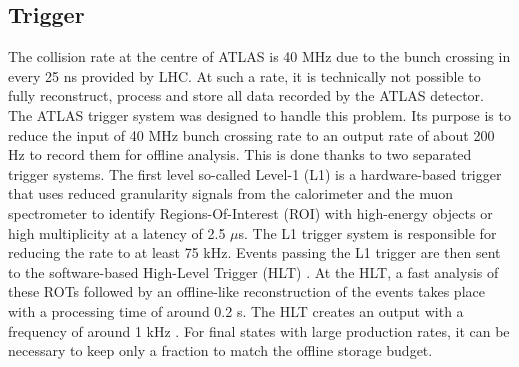 \subsection{Trigger}
\label{chap2:ATLAS:Trigger}
The collision rate at the centre of ATLAS is 40 MHz due to the bunch crossing in every 25 ns provided by LHC. At such a rate, it is technically not possible to fully reconstruct, process and store all data recorded by the ATLAS detector. The ATLAS trigger system was designed to handle this problem. Its purpose  is to reduce the input of 40 MHz bunch crossing rate to an output rate of about 200 Hz to record them for offline analysis. This is done thanks to two separated trigger systems. The first level so-called Level-1 (L1) \cite{Trigger_L1} is a hardware-based trigger that uses reduced granularity signals from the calorimeter and the muon spectrometer to identify Regions-Of-Interest (ROI) with high-energy objects or high multiplicity at a latency of 2.5 $\mu$s. The L1 trigger system is responsible for reducing the rate to at least 75 kHz. Events passing the L1 trigger are then sent to the software-based High-Level Trigger (HLT) \cite{Trigger_HLT}. At the HLT, a fast analysis of these ROTs followed by an offline-like reconstruction of the events takes place with a processing time of around 0.2 s. The HLT creates an output with a frequency of around 1 kHz \cite{DQ}. For final states with large production rates, it can be necessary to keep only a fraction to match the offline storage budget.


